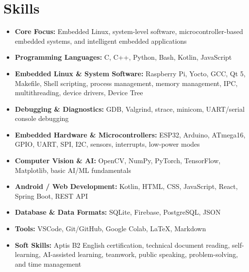 \documentclass[10pt, letterpaper]{article}
\begin{document}
    \section{Skills}
    \begin{itemize}
        \item \textbf{Core Focus:} Embedded Linux, system-level software, microcontroller-based embedded systems, and intelligent embedded applications

        \item \textbf{Programming Languages:} C, C++, Python, Bash, Kotlin, JavaScript

        \item \textbf{Embedded Linux \& System Software:} Raspberry Pi, Yocto, GCC, Qt 5, Makefile, Shell scripting, process management, memory management, IPC, multithreading, device drivers, Device Tree

        \item \textbf{Debugging \& Diagnostics:} GDB, Valgrind, strace, minicom, UART/serial console debugging

        \item \textbf{Embedded Hardware \& Microcontrollers:} ESP32, Arduino, ATmega16, GPIO, UART, SPI, I2C, sensors, interrupts, low-power modes

        \item \textbf{Computer Vision \& AI:} OpenCV, NumPy, PyTorch, TensorFlow, Matplotlib, basic AI/ML fundamentals

        \item \textbf{Android / Web Development:} Kotlin, HTML, CSS, JavaScript, React, Spring Boot, REST API

        \item \textbf{Database \& Data Formats:} SQLite, Firebase, PostgreSQL, JSON

        \item \textbf{Tools:} VSCode, Git/GitHub, Google Colab, LaTeX, Markdown

        \item \textbf{Soft Skills:} Aptis B2 English certification, technical document reading, self-learning, AI-assisted learning, teamwork, public speaking, problem-solving, and time management
    \end{itemize}

    
\end{document}
